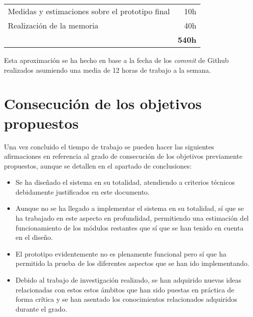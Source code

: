 \begin{table}[htb]
\begin{tabular}{l r}
				                                                    &                                  \\
\hline
Medidas y estimaciones sobre el prototipo final                     &10h                               \\ 
Realización de la memoria                                           &40h                               \\
\hline 
\hline
\multirow{2}{9cm}{\centering{\textbf{TOTAL}}}                       &\multirow{2}{2cm}{\textbf{540h}}  \\
				                                                    &                                  \\
\end{tabular}
\end{table}

Esta aproximación se ha hecho en base a la fecha de los \emph{commit} de Github realizados asumiendo una media de 12 horas de trabajo a la semana.

\section{Consecución de los objetivos propuestos}

Una vez concluido el tiempo de trabajo se pueden hacer las siguientes afirmaciones en referencia al grado de consecución de los objetivos previamente propuestos, aunque se detallen en el apartado de conclusiones:

\begin{itemize}
\item Se ha diseñado el sistema en su totalidad, atendiendo a criterios técnicos debidamente justificados en este documento.
\item Aunque no se ha llegado a implementar el sistema en su totalidad, sí que se ha trabajado en este aspecto en profundidad, permitiendo una estimación del funcionamiento de los módulos restantes que sí que se han tenido en cuenta en el diseño.
\item El prototipo evidentemente no es plenamente funcional pero sí que ha permitido la prueba de los diferentes aspectos que se han ido implementando.
\item Debido al trabajo de investigación realizado, se han adquirido nuevas ideas relacionadas con estos estos ámbitos que han sido puestas en práctica de forma crítica y se han asentado los conocimientos relacionados adquiridos durante el grado.
\end{itemize}